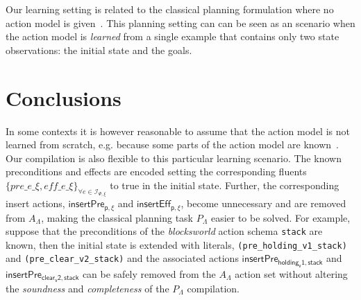\documentclass{article}
\begin{document}
Our learning setting is related to the classical planning formulation where no action model is given~\cite{SternJ17}. This planning setting can can be seen as an scenario when the action model is {\em learned} from a single example that contains only two state observations: the initial state and the goals.

\section{Conclusions}
\label{sec:conclusions}
In some contexts it is however reasonable to assume that the action model is not learned from scratch, e.g. because some parts of the action model are known~\cite{ZhuoNK13,sreedharan2018handling,pereira2018heuristic}. Our compilation is also flexible to this particular learning scenario. The known preconditions and effects are encoded setting the corresponding fluents $\{pre\_e\_\xi, eff\_e\_\xi\}_{\forall e\in{\mathcal I}_{\Psi,\xi}}$ to true in the initial state. Further, the corresponding insert actions, $\mathsf{insertPre_{p,\xi}}$ and $\mathsf{insertEff_{p,\xi}}$, become unnecessary and are removed from $A_{\Lambda}$, making the classical planning task $P_{\Lambda}$ easier to be solved. For example, suppose that the preconditions of the {\em blocksworld} action schema {\tt stack} are known, then the initial state is extended with literals, {\small\tt(pre\_holding\_v1\_stack)} and {\small\tt(pre\_clear\_v2\_stack)} and the associated actions $\mathsf{insertPre_{holding_v1,stack}}$ and $\mathsf{insertPre_{clear_v2,stack}}$ can be safely removed from the $A_{\Lambda}$ action set without altering the {\em soundness} and {\em completeness} of the $P_{\Lambda}$ compilation.



\end{document}
